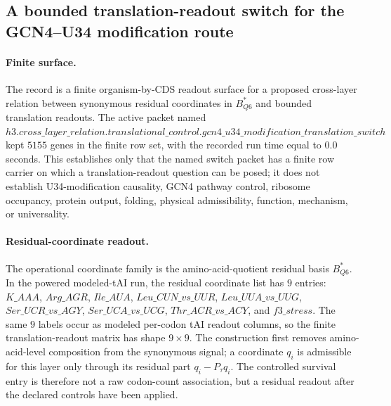 \subsection{A bounded translation-readout switch for the GCN4--U34 modification route}\label{sec:bioreality-gcn4-u34-q6-translation-switch}

\paragraph{Finite surface.}
The record is a finite organism-by-CDS readout surface for a proposed cross-layer relation between synonymous residual coordinates in $B^*_{Q6}$ and bounded translation readouts.  The active packet named $h3.cross\_layer\_relation.translational\_control.gcn4\_u34\_modification\_translation\_switch$ kept $5155$ genes in the finite row set, with the recorded run time equal to $0.0$ seconds.  This establishes only that the named switch packet has a finite row carrier on which a translation-readout question can be posed; it does not establish U34-modification causality, GCN4 pathway control, ribosome occupancy, protein output, folding, physical admissibility, function, mechanism, or universality.

\paragraph{Residual-coordinate readout.}
The operational coordinate family is the amino-acid-quotient residual basis $B^*_{Q6}$.  In the powered modeled-tAI run, the residual coordinate list has $9$ entries:
$K\_AAA$, $Arg\_AGR$, $Ile\_AUA$, $Leu\_CUN\_vs\_UUR$, $Leu\_UUA\_vs\_UUG$, $Ser\_UCR\_vs\_AGY$, $Ser\_UCA\_vs\_UCG$, $Thr\_ACR\_vs\_ACY$, and $f3\_stress$.  The same $9$ labels occur as modeled per-codon tAI readout columns, so the finite translation-readout matrix has shape $9\times 9$.  The construction first removes amino-acid-level composition from the synonymous signal; a coordinate $q_i$ is admissible for this layer only through its residual part $q_i-P_{\tau}q_i$.  The controlled survival entry is therefore not a raw codon-count association, but a residual readout after the declared controls have been applied.

